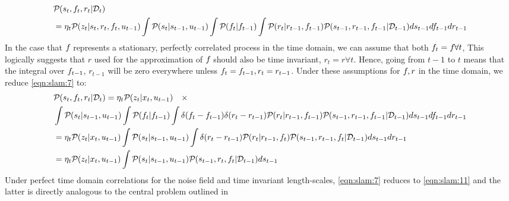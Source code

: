 	\begin{align}
	&\mathcal{P}_{} ( s_t, f_{ t}, r_t | \mathcal{D}_t ) \nonumber \\
	& = \eta_t\mathcal{P}_{} ( z_t | s_t, r_t, f_{ t}, u_{t-1} ) \int \mathcal{P}_{} (  s_t| s_{t-1}, u_{t-1} )  \int \mathcal{P}_{} (  f_{ t}|  f_{ t-1} ) \int \mathcal{P}_{} (  r_t|  r_{t-1}, f_{ t-1} ) \mathcal{P}_{} ( s_{t-1}, r_{t-1}, f_{ t-1}| \mathcal{D}_{t-1} )  ds_{t-1} df_{ t-1} dr_{t-1}   \label{eqn:slam:7} 
	\end{align} 
	In the case that $f_{ }$ represents a stationary, perfectly correlated process in the time domain, we can assume that both $f_{ t} = f_{ } \forall t$, This logically suggests that $r$ used for the approximation of $f_{ }$ should also be time invariant, $r_t = r \forall t$. Hence, going from $t-1$ to $t$ means that the integral over $f_{ t-1}$, $r_{t-1}$ will be zero everywhere unless $f_{ t}=f_{ t-1}, r_t = r_{t-1}$. 
	Under these assumptions for $f_{ }, r$ in the time domain, we reduce \cref{eqn:slam:7} to:
	\begin{align}
	&\mathcal{P}_{} ( s_t, f_{ t}, r_t | \mathcal{D}_t ) = \eta_t\mathcal{P}_{} ( z_t | x_t, u_{t-1} )\quad  \times \nonumber \\
	& \int \mathcal{P}_{} (  s_t| s_{t-1}, u_{t-1} )  \int \mathcal{P}_{} (  f_{ t}|  f_{ t-1} ) \int \delta(f_{ t} - f_{ t-1})  \delta(r_{t} - r_{t-1})  \mathcal{P}_{} (  r_t|  r_{t-1}, f_{ t-1} ) \mathcal{P}_{} ( s_{t-1}, r_{t-1}, f_{ t-1}| \mathcal{D}_{t-1} )  ds_{t-1} df_{ t-1} dr_{t-1}   \label{eqn:slam:8}  \\
	& = \eta_t\mathcal{P}_{} ( z_t | x_t, u_{t-1} ) \int \mathcal{P}_{} (  s_t| s_{t-1}, u_{t-1} ) \int \delta(r_{t} - r_{t-1})  \mathcal{P}_{} (  r_t|  r_{t-1}, f_{ t} ) \mathcal{P}_{} ( s_{t-1}, r_{t-1}, f_{ t}| \mathcal{D}_{t-1} )  ds_{t-1}  dr_{t-1}   \label{eqn:slam:9}  \\
	& = \eta_t\mathcal{P}_{} ( z_t | x_t, u_{t-1} ) \int \mathcal{P}_{} (  s_t| s_{t-1}, u_{t-1} ) \mathcal{P}_{} ( s_{t-1}, r_t, f_{ t}| \mathcal{D}_{t-1} )  ds_{t-1}    \label{eqn:slam:10}
	\end{align} 
	Under perfect time domain correlations for the noise field and time invariant length-scales, \cref{eqn:slam:7} reduces to \cref{eqn:slam:11} and the latter is directly analogous to the central problem outlined in \cite{thrun2001probabilistic}
	